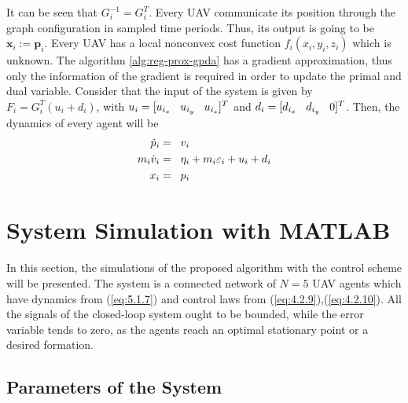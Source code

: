     \vspace{4.0mm}
    
    It can be seen that $G_i^{-1} = G_i^T$. Every UAV communicate its position through the graph configuration in sampled time periods. Thus, its output is going to be $\boldsymbol{x}_i := \boldsymbol{p}_i$. Every UAV has a local nonconvex cost function $f_i(x_i,y_i,z_i)$ which is unknown. The algorithm \ref{alg:reg-prox-gpda} has a gradient approximation, thus only the information of the gradient is required in order to update the primal and dual variable. Consider that the input of the system is given by $F_i = G_i^T (u_i + d_i)$, with $u_i = [u_{i_x} \hspace{3.0mm} u_{i_y} \hspace{3.0mm} u_{i_z}]^T$ and $d_i = [d_{i_x} \hspace{3.0mm} d_{i_y} \hspace{3.0mm} 0]^T$. Then, the dynamics of every agent will be
    \begin{equation}\label{eq:5.1.7}
        \begin{align*}
             \dot{p}_i &= \hspace{2.0mm} v_i\\
             m_i \dot{v}_i &= \hspace{2.0mm} \eta_i + m_i \varepsilon_i + u_i + d_i\\
             x_i &= \hspace{2.0mm} p_i
         \end{align*}
    \end{equation}
     
\section{System Simulation with MATLAB}

    In this section, the simulations of the proposed algorithm with the control scheme will be presented. The system is a connected network of $N = 5$ UAV agents which have dynamics from (\ref{eq:5.1.7}) and control laws from (\ref{eq:4.2.9}),(\ref{eq:4.2.10}). All the signals of the closed-loop system ought to be bounded, while the error variable tends to zero, as the agents reach an optimal stationary point or a desired formation.
    
\subsection{Parameters of the System}

